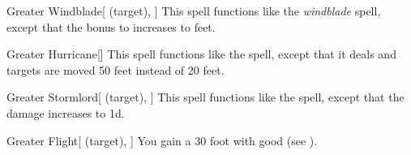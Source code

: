 \lowercase{\hypertarget{spell:Greater Windblade}{}}\label{spell:Greater Windblade}
\begin{attuneability}[Rank 6]{\hypertarget{spell:Greater Windblade}{Greater Windblade}}[ (target), ]
This spell functions like the \textit{windblade} spell, except that the bonus to  increases to  feet.
\end{attuneability}
\vspace{0.25em}



\lowercase{\hypertarget{spell:Greater Hurricane}{}}\label{spell:Greater Hurricane}
\begin{freeability}[Rank 7]{\hypertarget{spell:Greater Hurricane}{Greater Hurricane}}[]
This spell functions like the  spell, except that it deals  and targets are moved 50 feet instead of 20 feet.
\end{freeability}
\vspace{0.25em}



\lowercase{\hypertarget{spell:Greater Stormlord}{}}\label{spell:Greater Stormlord}
\begin{attuneability}[Rank 7]{\hypertarget{spell:Greater Stormlord}{Greater Stormlord}}[ (target), ]
This spell functions like the  spell, except that the damage increases to  \plus1d.
\end{attuneability}
\vspace{0.25em}



\lowercase{\hypertarget{spell:Greater Flight}{}}\label{spell:Greater Flight}
\begin{attuneability}[Rank 8]{\hypertarget{spell:Greater Flight}{Greater Flight}}[ (target), ]
You gain a 30 foot  with good  (see ).
\end{attuneability}
\vspace{0.25em}


